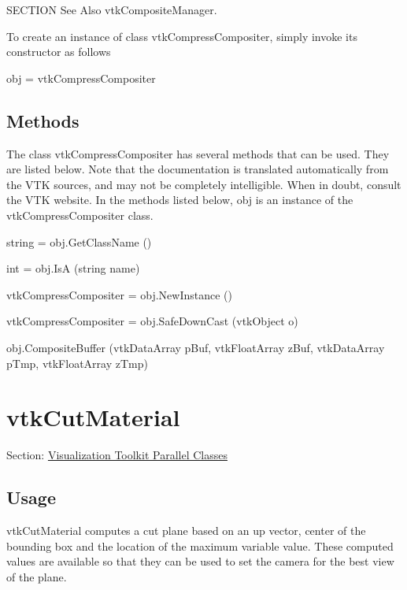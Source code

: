 S\-E\-C\-T\-I\-O\-N See Also vtk\-Composite\-Manager.

To create an instance of class vtk\-Compress\-Compositer, simply invoke its constructor as follows \begin{DoxyVerb}  obj = vtkCompressCompositer
\end{DoxyVerb}
 \hypertarget{vtkwidgets_vtkxyplotwidget_Methods}{}\subsection{Methods}\label{vtkwidgets_vtkxyplotwidget_Methods}
The class vtk\-Compress\-Compositer has several methods that can be used. They are listed below. Note that the documentation is translated automatically from the V\-T\-K sources, and may not be completely intelligible. When in doubt, consult the V\-T\-K website. In the methods listed below, {\ttfamily obj} is an instance of the vtk\-Compress\-Compositer class. 
\begin{DoxyItemize}
\item {\ttfamily string = obj.\-Get\-Class\-Name ()}  
\item {\ttfamily int = obj.\-Is\-A (string name)}  
\item {\ttfamily vtk\-Compress\-Compositer = obj.\-New\-Instance ()}  
\item {\ttfamily vtk\-Compress\-Compositer = obj.\-Safe\-Down\-Cast (vtk\-Object o)}  
\item {\ttfamily obj.\-Composite\-Buffer (vtk\-Data\-Array p\-Buf, vtk\-Float\-Array z\-Buf, vtk\-Data\-Array p\-Tmp, vtk\-Float\-Array z\-Tmp)}  
\end{DoxyItemize}\hypertarget{vtkparallel_vtkcutmaterial}{}\section{vtk\-Cut\-Material}\label{vtkparallel_vtkcutmaterial}
Section\-: \hyperlink{sec_vtkparallel}{Visualization Toolkit Parallel Classes} \hypertarget{vtkwidgets_vtkxyplotwidget_Usage}{}\subsection{Usage}\label{vtkwidgets_vtkxyplotwidget_Usage}
vtk\-Cut\-Material computes a cut plane based on an up vector, center of the bounding box and the location of the maximum variable value. These computed values are available so that they can be used to set the camera for the best view of the plane.

